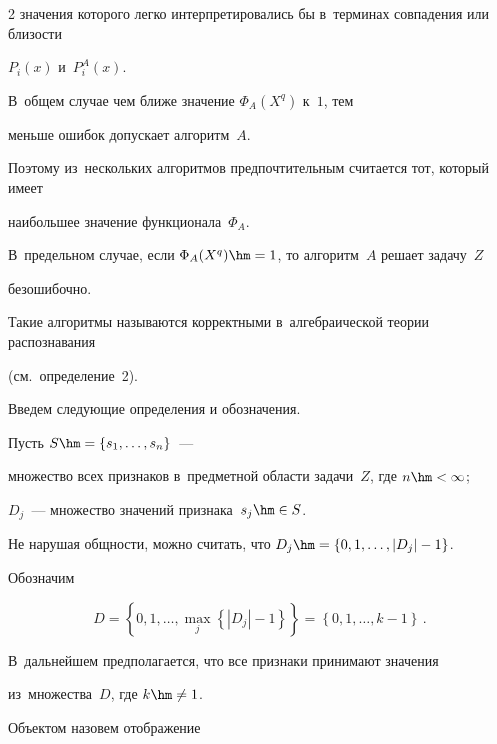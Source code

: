 \begin{multicols}{2}
значения которого легко интерпретировались бы в~терминах совпадения или близости 


$P_{i}(x)$ и~$P^{A}_{i}(x)$.


В~общем случае чем ближе значение $\Phi_{A}(X^{q})$ к~$1$, тем 


меньше ошибок допускает алгоритм~$A$.


Поэтому из~нескольких алгоритмов предпочтительным считается тот, который имеет 


наибольшее значение функционала~$\Phi_{A}$.


В~предельном случае, если $\Phi_{A}(X^{q})\hm=1$, то алгоритм~$A$ решает задачу~$Z$ 


безошибочно.


Такие алгоритмы называются корректными в~алгебраической теории распознавания 


(см.\ определение~2).





Введем следующие определения и обозначения.


Пусть $S\hm=\left\lbrace s_{1},\ldots,s_{n} \right\rbrace $~--- 


множество всех признаков в~предметной области задачи~$Z$, где $n\hm<\infty $;


 $D_{j}$~--- множество значений признака~$s_{j}\hm\in S$.


Не нарушая общности, можно считать, что $D_{j}\hm=\left\lbrace 0,1,\ldots,|D_{j}|-1 


\right\rbrace $.


Обозначим


$$


 D=\left\lbrace 0,1,\ldots,\max\limits_{j} \left\lbrace |D_{j}|-1\right\rbrace 


 \right\rbrace =\left\lbrace 0,1,\ldots,k-1 \right\rbrace \,. 


 $$





В~дальнейшем предполагается, что все признаки принимают значения 


из~множества~$D$, где $k\hm\neq 1 $.


Объектом назовем отображение





\pagebreak





\noindent



\end{multicols}
